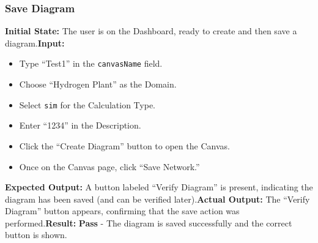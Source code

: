 \documentclass[12pt, titlepage]{article}
\begin{document}
\subsubsection{Save Diagram} \textbf{Initial State:} The user is on the Dashboard, ready to create and then save a diagram.\newline \textbf{Input:} \begin{itemize} \item Type “Test1” in the \texttt{canvasName} field.
\item Choose “Hydrogen Plant” as the Domain.
\item Select \texttt{sim} for the Calculation Type.
\item Enter “1234” in the Description.
\item Click the “Create Diagram” button to open the Canvas.
\item Once on the Canvas page, click “Save Network.”
\end{itemize} \textbf{Expected Output:} A button labeled “Verify Diagram” is present, indicating the diagram has been saved (and can be verified later).\newline \textbf{Actual Output:} The “Verify Diagram” button appears, confirming that the save action was performed.\newline \textbf{Result:} \textbf{Pass} - The diagram is saved successfully and the correct button is shown.
\end{document}
